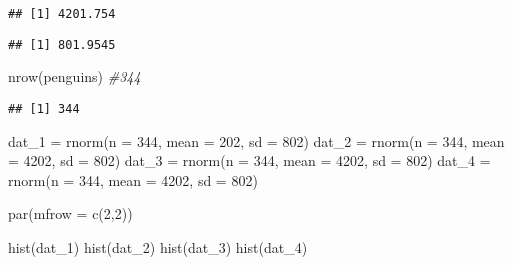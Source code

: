 \documentclass[
]{article}
\newenvironment{Shaded}{\begin{snugshade}}{\end{snugshade}}
\newcommand{\AttributeTok}[1]{\textcolor[rgb]{0.77,0.63,0.00}{#1}}
\newcommand{\CommentTok}[1]{\textcolor[rgb]{0.56,0.35,0.01}{\textit{#1}}}
\newcommand{\ConstantTok}[1]{\textcolor[rgb]{0.00,0.00,0.00}{#1}}
\newcommand{\DecValTok}[1]{\textcolor[rgb]{0.00,0.00,0.81}{#1}}
\newcommand{\FunctionTok}[1]{\textcolor[rgb]{0.00,0.00,0.00}{#1}}
\newcommand{\NormalTok}[1]{#1}
\newcommand{\OtherTok}[1]{\textcolor[rgb]{0.56,0.35,0.01}{#1}}
\newcommand{\SpecialCharTok}[1]{\textcolor[rgb]{0.00,0.00,0.00}{#1}}
\begin{document}
\begin{verbatim}
## [1] 4201.754
\end{verbatim}

\begin{Shaded}
\end{Shaded}

\begin{verbatim}
## [1] 801.9545
\end{verbatim}

\begin{Shaded}
\begin{Highlighting}[]
\FunctionTok{nrow}\NormalTok{(penguins) }\CommentTok{\#344}
\end{Highlighting}
\end{Shaded}

\begin{verbatim}
## [1] 344
\end{verbatim}

\begin{Shaded}
\begin{Highlighting}[]
\NormalTok{dat\_1 }\OtherTok{=} \FunctionTok{rnorm}\NormalTok{(}\AttributeTok{n =} \DecValTok{344}\NormalTok{, }\AttributeTok{mean =} \DecValTok{202}\NormalTok{, }\AttributeTok{sd =} \DecValTok{802}\NormalTok{)}
\NormalTok{dat\_2 }\OtherTok{=} \FunctionTok{rnorm}\NormalTok{(}\AttributeTok{n =} \DecValTok{344}\NormalTok{, }\AttributeTok{mean =} \DecValTok{4202}\NormalTok{, }\AttributeTok{sd =} \DecValTok{802}\NormalTok{)}
\NormalTok{dat\_3 }\OtherTok{=} \FunctionTok{rnorm}\NormalTok{(}\AttributeTok{n =} \DecValTok{344}\NormalTok{, }\AttributeTok{mean =} \DecValTok{4202}\NormalTok{, }\AttributeTok{sd =} \DecValTok{802}\NormalTok{)}
\NormalTok{dat\_4 }\OtherTok{=} \FunctionTok{rnorm}\NormalTok{(}\AttributeTok{n =} \DecValTok{344}\NormalTok{, }\AttributeTok{mean =} \DecValTok{4202}\NormalTok{, }\AttributeTok{sd =} \DecValTok{802}\NormalTok{)}

\FunctionTok{par}\NormalTok{(}\AttributeTok{mfrow =} \FunctionTok{c}\NormalTok{(}\DecValTok{2}\NormalTok{,}\DecValTok{2}\NormalTok{))}

\FunctionTok{hist}\NormalTok{(dat\_1)}
\FunctionTok{hist}\NormalTok{(dat\_2)}
\FunctionTok{hist}\NormalTok{(dat\_3)}
\FunctionTok{hist}\NormalTok{(dat\_4)}
\end{Highlighting}
\end{Shaded}
\end{document}

